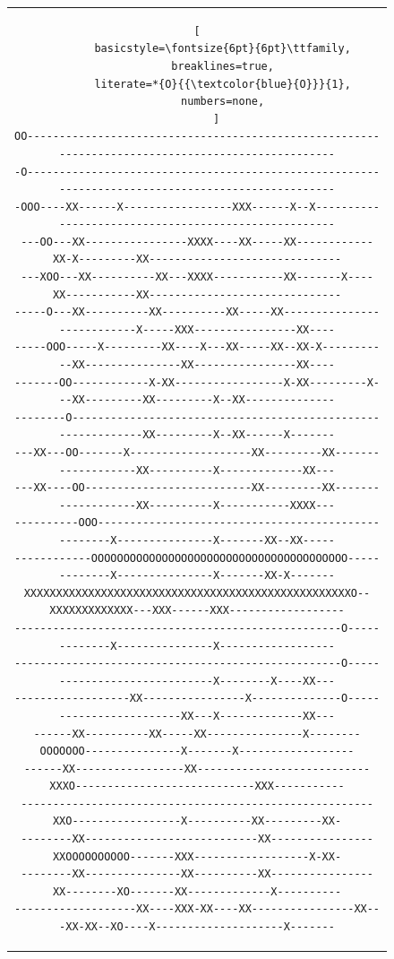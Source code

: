 \documentclass[12pt,a4paper]{article}
\begin{document}
  \begin{figure}[H]
    \centering
    \begin{tabular}{c}
      \begin{lstlisting}[
        basicstyle=\fontsize{6pt}{6pt}\ttfamily,
        breaklines=true,
        literate=*{O}{{\textcolor{blue}{O}}}{1},
        numbers=none,
      ]
OO--------------------------------------------------------------------------------------------------
-O--------------------------------------------------------------------------------------------------
-OOO----XX------X-----------------XXX------X--X-----------------------------------------------------
---OO---XX----------------XXXX----XX-----XX------------XX-X---------XX------------------------------
---XOO---XX----------XX---XXXX-----------XX-------X----XX-----------XX------------------------------
-----O---XX----------XX----------XX-----XX---------------------------X-----XXX----------------XX----
-----OOO-----X---------XX----X---XX-----XX--XX-X-----------XX---------------XX----------------XX----
-------OO------------X-XX-----------------X-XX---------X---XX---------XX---------X--XX--------------
--------O-------------------------------------------------------------XX---------X--XX------X-------
---XX---OO-------X-------------------XX---------XX-------------------XX----------X-------------XX---
---XX----OO--------------------------XX---------XX-------------------XX----------X-----------XXXX---
----------OOO----------------------------------------------------X---------------X-------XX--XX-----
------------OOOOOOOOOOOOOOOOOOOOOOOOOOOOOOOOOOOOOOOO-------------X---------------X-------XX-X-------
XXXXXXXXXXXXXXXXXXXXXXXXXXXXXXXXXXXXXXXXXXXXXXXXXXXO--XXXXXXXXXXXXX---XXX------XXX------------------
---------------------------------------------------O-------------X---------------X------------------
---------------------------------------------------O-----------------------------X--------X----XX---
------------------XX----------------X--------------O------------------------XX---X-------------XX---
------XX----------XX-----XX---------------X--------OOOOOOO---------------X-------X------------------
------XX-----------------XX---------------------------XXXO----------------------------XXX-----------
-------------------------------------------------------XXO-----------------X----------XX---------XX-
--------XX---------------------------XX----------------XXOOOOOOOOOO-------XXX------------------X-XX-
--------XX---------------XX----------XX----------------XX--------XO-------XX-------------X----------
-------------------XX----XXX-XX----XX----------------XX---XX-XX--XO----X--------------------X-------

\end{lstlisting}
\end{tabular}
\end{figure}
\end{document}
